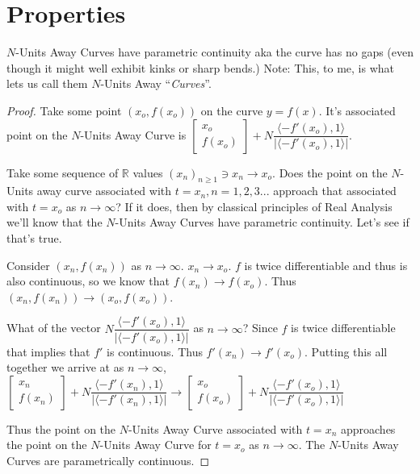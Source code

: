 \section{Properties}

\begin{myTrm}
    $N$-Units Away Curves have parametric continuity aka the curve has no gaps (even though it might well exhibit kinks or sharp bends.) Note: This, to me, is what lets us call them $N$-Units Away ``\textit{Curves}''.
\end{myTrm}

\begin{proof}

Take some point $(x_o, f(x_o))$ on the curve $y = f(x)$. It’s associated point on the $N$-Units Away Curve is $\begin{bmatrix} x_o \\ f(x_o) \end{bmatrix} + N \dfrac{\langle -f'(x_o), 1 \rangle}{|\langle -f'(x_o), 1 \rangle|}$.

Take some sequence of $\mathbb{R}$ values $(x_n)_{n \geq 1} \ni x_n \xrightarrow{} x_o$. Does the point on the $N$-Units away curve associated with $t = x_n, n = 1, 2, 3...$ approach that associated
with $t = x_o$ as $n \xrightarrow{} \infty$? If it does, then by classical principles of Real Analysis we’ll know that the $N$-Units Away Curves have parametric continuity. Let’s see if
that’s true.

Consider $(x_n, f(x_n))$ as $n \xrightarrow{} \infty$. $x_n \xrightarrow{} x_o$. $f$ is twice differentiable and thus is also continuous, so we know that $f(x_n) \xrightarrow{} f(x_o)$. Thus $(x_n, f(x_n)) \xrightarrow{} (x_o, f(x_o))$.

What of the vector $N \dfrac{\langle -f'(x_o), 1 \rangle}{|\langle -f'(x_o), 1 \rangle|}$ as $n \xrightarrow{} \infty$? Since $f$ is twice differentiable that implies that $f'$ is continuous. Thus $f'(x_n) \xrightarrow{} f'(x_o)$. Putting this all together we arrive at as $n \xrightarrow{} \infty$, $\begin{bmatrix} x_n \\ f(x_n) \end{bmatrix} + N \dfrac{\langle -f'(x_n), 1 \rangle}{|\langle -f'(x_n), 1 \rangle|} \xrightarrow{} \begin{bmatrix} x_o \\ f(x_o) \end{bmatrix} + N \dfrac{\langle -f'(x_o), 1 \rangle}{|\langle -f'(x_o), 1 \rangle|}$

Thus the point on the $N$-Units Away Curve associated with $t = x_n$ approaches the point on the $N$-Units Away Curve for $t = x_o$ as $n \xrightarrow{} \infty$. The $N$-Units Away Curves are parametrically continuous.

\end{proof}

